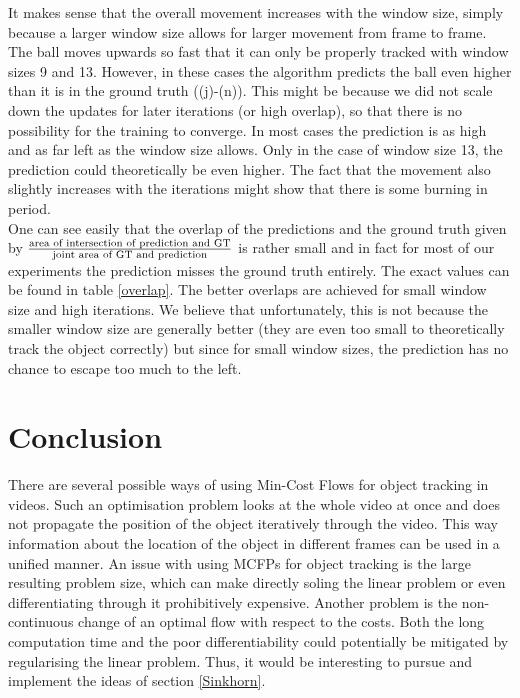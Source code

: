 \documentclass{article}
\begin{document}
It makes sense that the overall movement increases with the window size, simply because a larger window size allows for larger movement from frame to frame. 
The ball moves upwards so fast that it can only be properly tracked with window sizes 9 and 13. However, in these cases the algorithm predicts the ball even higher than it is in the ground truth ((j)-(n)). This might be because we did not scale down the updates for later iterations (or high overlap), so that there is no possibility for the training to converge. In most cases the prediction is as high and as far left as the window size allows. Only in the case of window size 13, the prediction could theoretically be even higher. The fact that the movement also slightly increases with the iterations might show that there is some burning in period.\\
One can see easily that the overlap of the predictions and the ground truth given by $\frac{\textnormal{area of intersection of prediction and GT}}{\textnormal{joint area of GT and prediction}}$ is rather small and in fact for most of our experiments the prediction misses the ground truth entirely. The exact values can be found in table \ref{overlap}. The better overlaps are achieved for small window size and high iterations. We believe that unfortunately, this is not because the smaller window size are generally better (they are even too small to theoretically track the object correctly) but since for small window sizes, the prediction has no chance to escape too much to the left.

\section{Conclusion}
There are several possible ways of using Min-Cost Flows for object tracking in videos. Such an optimisation problem looks at the whole video at once and does not propagate the position of the object iteratively through the video. This way information about the location of the object in different frames can be used in a unified manner. An issue with using MCFPs for object tracking is the large resulting problem size, which can make directly soling the linear problem or even differentiating through it prohibitively expensive. Another problem is the non-continuous change of an optimal flow with respect to the costs. Both the long computation time and the poor differentiability could potentially be mitigated by regularising the linear problem. Thus, it would be interesting to pursue and implement the ideas of section \ref{Sinkhorn}.



\end{document}
